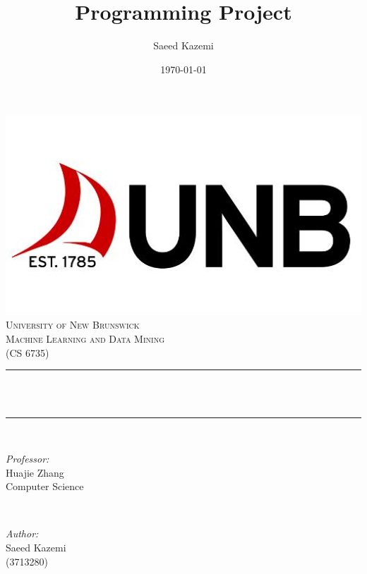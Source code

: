 \documentclass[12pt]{article}
\title{Programming Project}				%
\author{Saeed Kazemi}				%
\date{\today}						%
\makeatletter
\let\thedate\@date
\let\thetitle\@title
\makeatother
\begin{document}


\begin{titlepage}
	\centering
    \vspace*{0.4 cm}
    \includegraphics[scale = 0.5]{figures/unb.jpg}\\[1.0 cm]	%
    \textsc{\LARGE \newline\newline University of New Brunswick}\\[1.8 cm]	%
	\textsc{\Large Machine Learning and Data Mining\\(CS 6735)}\\[0.5 cm]				%
	\rule{\linewidth}{0.2 mm} \\[0.4 cm]
	{ \huge \bfseries \thetitle}\\
	\rule{\linewidth}{0.2 mm} \\[1.5 cm]
	
	\begin{minipage}{0.5\textwidth}
		\begin{flushleft} \large
			\emph{Professor:}\\
			Huajie Zhang\\
            Computer Science\\
			\end{flushleft}
			\end{minipage}~
			\begin{minipage}{0.5\textwidth}
            
			\begin{flushright} \large
			\emph{Author:} \\
			Saeed Kazemi\\ (3713280)\\

		\end{flushright}
        
	\end{minipage}\\[1 cm]
	
	
    \thedate
    
    
    
	
\end{titlepage}
\end{document}
